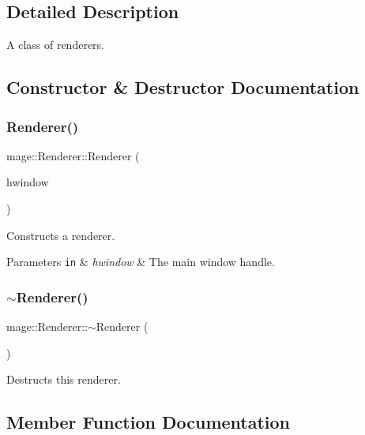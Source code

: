 \subsection{Detailed Description}
A class of renderers. 

\subsection{Constructor \& Destructor Documentation}
\hypertarget{classmage_1_1_renderer_a762dcda433c319af237d1dfd9bc6095f}{}\label{classmage_1_1_renderer_a762dcda433c319af237d1dfd9bc6095f} 
\subsubsection{\texorpdfstring{Renderer()}{Renderer()}}
{\footnotesize\ttfamily mage\+::\+Renderer\+::\+Renderer (\begin{DoxyParamCaption}\item[{H\+W\+ND}]{hwindow }\end{DoxyParamCaption})}

Constructs a renderer.


\begin{DoxyParams}[1]{Parameters}
\mbox{\tt in}  & {\em hwindow} & The main window handle. \\
\hline
\end{DoxyParams}
\hypertarget{classmage_1_1_renderer_a997e041f28cc71d069d1ab7d29fe6ced}{}\label{classmage_1_1_renderer_a997e041f28cc71d069d1ab7d29fe6ced} 
\subsubsection{\texorpdfstring{$\sim$\+Renderer()}{~Renderer()}}
{\footnotesize\ttfamily mage\+::\+Renderer\+::$\sim$\+Renderer (\begin{DoxyParamCaption}{ }\end{DoxyParamCaption})\hspace{0.3cm}{\ttfamily [virtual]}}

Destructs this renderer. 

\subsection{Member Function Documentation}
\hypertarget{classmage_1_1_renderer_a4932c51d0f6e56269712024d2d0322ef}{}\label{classmage_1_1_renderer_a4932c51d0f6e56269712024d2d0322ef} 

